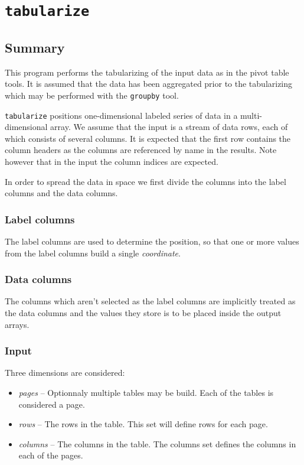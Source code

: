 \documentclass{report}
\begin{document}
\section{\texttt{tabularize}}

\subsection{Summary}
This program performs the tabularizing of the input data as in the pivot table
tools. It is assumed that the data has been aggregated prior to the tabularizing
which may be performed with the \texttt{groupby} tool.

\texttt{tabularize} positions one-dimensional labeled series of data in a
multi-dimensional array. We assume that the input is a stream of data rows,
each of which consists of several columns. It is expected that the first row
contains the column headers as the columns are referenced by name in the results.
Note however that in the input the column indices are expected.

In order to spread the data in space we first divide the columns into the
label columns and the data columns.

\subsubsection{Label columns}
The label columns are used to determine the position, so that one or more values
from the label columns build a single \textit{coordinate}.

\subsubsection{Data columns}
The columns which aren't selected as the label columns are implicitly treated as
the data columns and the values they store is to be placed inside the output
arrays.

\subsubsection{Input}
Three dimensions are considered:

\begin{itemize}
	\item \textit{pages} -- Optionnaly multiple tables may be build. Each
		of the tables is considered a page.
	\item \textit{rows} -- The rows in the table. This set will define rows
		for each page.
	\item \textit{columns} -- The columns in the table. The columns set
		defines the columns in each of the pages.
\end{itemize}
\end{document}
